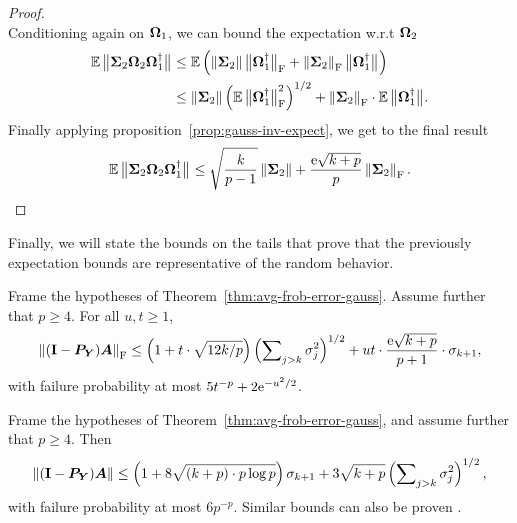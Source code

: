 \begin{proof}
$$$$
Conditioning again on $\mtx{\Omega}_1$, we can bound the expectation w.r.t
 $\mtx{\Omega}_2$
\begin{align*}
\Expect \smnorm{}{ \mtx{\Sigma}_2 \mtx{\Omega}_2
\mtx{\Omega}_1^\psinv }
    &\leq \Expect \left( \norm{\mtx{\Sigma}_2} \smnorm{\rm F}{\mtx{\Omega}_1^\psinv}
        + \fnorm{\mtx{\Sigma}_2} \smnorm{}{\mtx{\Omega}_1^\psinv} \right) \\
    &\leq \norm{\mtx{\Sigma}_2} \left( \Expect \smnorm{\rm F}{\mtx{\Omega}_1^\psinv}^2 \right)^{1/2}
        + \fnorm{\mtx{\Sigma}_2} \cdot \Expect \smnorm{}{\mtx{\Omega}_1^\psinv}.
\end{align*}
Finally applying proposition~\ref{prop:gauss-inv-expect}, we get to the final
result
$$
\Expect \smnorm{}{ \mtx{\Sigma}_2 \mtx{\Omega}_2
\mtx{\Omega}_1^\psinv }
    \leq \sqrt{\frac{k}{p-1}} \norm{\mtx{\Sigma}_2}
    + \frac{\econst\sqrt{k+p}}{p} \fnorm{\mtx{\Sigma}_2}.
$$
\end{proof}

Finally, we will state the bounds on the tails that prove that the 
previously expectation bounds are representative of the random behavior.

\begin{theorem} \label{thm:tail-frob-error-gauss}
Frame the hypotheses of Theorem~\ref{thm:avg-frob-error-gauss}.
Assume further that $p \geq 4$.  For all $u, t \geq 1$,
$$
\fnorm{ (\Id - \mtx{P}_{\mtx{Y}}) \mtx{A} }
    \leq \left( 1 + t \cdot \sqrt{12k/p} \right)
    \left( \sum\nolimits_{j > k} \sigma_j^2 \right)^{1/2}
    + ut \cdot \frac{\econst\sqrt{k+p}}{p+1} \cdot \sigma_{k+1},
$$
with failure probability at most $5 t^{-p} + 2 \econst^{-u^2/2}$.
\end{theorem}

\begin{theorem} \label{thm:tail-spec-error-gauss}
Frame the hypotheses of Theorem~\ref{thm:avg-frob-error-gauss}, and assume further that $p \geq 4$.  Then
$$
\norm{ (\Id - \mtx{P}_{\mtx{Y}}) \mtx{A} }
    \leq \left( 1 + 8 \sqrt{(k + p) \cdot p \log p} \right) \sigma_{k+1}
        + 3 \sqrt{k+p} \left( \sum\nolimits_{j > k} \sigma_j^2 \right)^{1/2},
$$
with failure probability at most $6 p^{-p}$.
Similar bounds can also be proven \cite{halko2011finding}.
\end{theorem}

